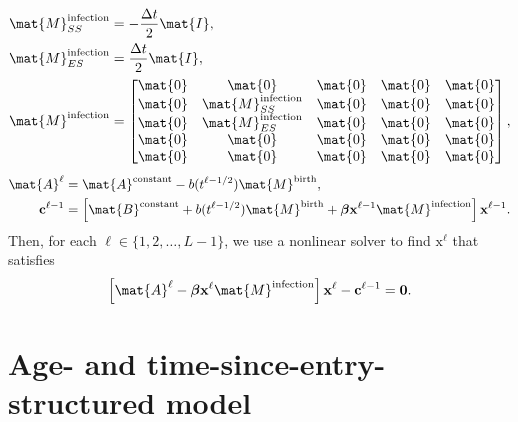 \documentclass{jpmarticle}
\renewcommand{\vec}[1]{\boldsymbol{\mathrm{#1}}}
\begin{document}
\begin{equation}
  \begin{split}
    \mat{M}_{SS}^{\text{infection}} &=
    - \frac{\Delta t}{2} \mat{I},
    \\
    \mat{M}_{ES}^{\text{infection}} &=
    \frac{\Delta t}{2} \mat{I},
    \\
    \mat{M}^{\text{infection}} &=
    \begin{bmatrix}
      \mat{0} & \mat{0} & \mat{0} & \mat{0} & \mat{0}
      \\
      \mat{0} & \mat{M}_{SS}^{\text{infection}} & \mat{0} & \mat{0} & \mat{0}
      \\
      \mat{0} & \mat{M}_{ES}^{\text{infection}} & \mat{0} & \mat{0} & \mat{0}
      \\
      \mat{0} & \mat{0} & \mat{0} & \mat{0} & \mat{0}
      \\
      \mat{0} & \mat{0} & \mat{0} & \mat{0} & \mat{0}
    \end{bmatrix},
  \end{split}
\end{equation}
\begin{equation}
  \begin{split}
    \mat{A}^{\ell} &=
    \mat{A}^{\text{constant}}
    - b(t^{\ell - 1 / 2}) \mat{M}^{\text{birth}},
    \\
    \vec{c}^{\ell - 1} &=
    \left[
      \mat{B}^{\text{constant}}
      + b(t^{\ell - 1 / 2}) \mat{M}^{\text{birth}}
      + \vec{\beta} \vec{x}^{\ell - 1} \mat{M}^{\text{infection}}
    \right] \vec{x}^{\ell - 1}.
  \end{split}
\end{equation}
Then, for each $\ell \in \{1, 2, \ldots, L - 1\}$,
we use a nonlinear solver to find $\vec{x}^{\ell}$ that satisfies
\begin{equation}
  \left[
    \mat{A}^{\ell}
    - \vec{\beta} \vec{x}^{\ell} \mat{M}^{\text{infection}}
  \right] \vec{x}^{\ell}
  - \vec{c}^{\ell - 1}
  = \vec{0}.
\end{equation}


\section{Age- and time-since-entry-structured model}
\end{document}
